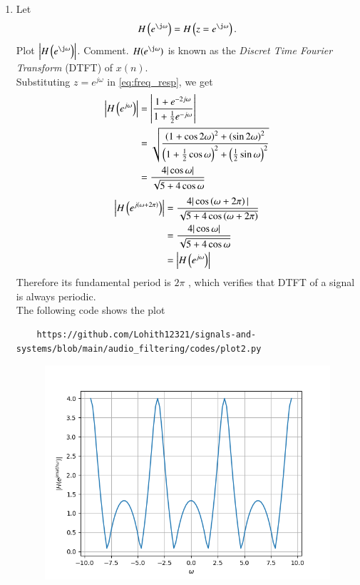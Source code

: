 \documentclass[journal,12pt,twocolumn]{IEEEtran}
\theoremstyle{remark}
\begin{document}
\begin{enumerate}[label=\thesection.\arabic*
,ref=\thesection.\theenumi]
\begin{enumerate}[label=\thesection.\arabic*
,ref=\thesection.\theenumi]
\item Let 
\begin{equation}
H\brak{e^{\j \omega}} = H\brak{z = e^{\j \omega}}.
\end{equation}
Plot $\abs{H\brak{e^{\j \omega}}}$.  Comment.  $H(e^{\j \omega})$ is
known as the {\em Discret Time Fourier Transform} (DTFT) of $x(n)$.\\
\solution 
Substituting $z = e^{j \omega}$ in \eqref{eq:freq_resp}, we get
\begin{align}
	\left|H\left(e^{j\omega}\right)\right| &= \left|\frac{1 + e^{-2j\omega}}{1 + \frac{1}{2}e^{-j\omega}}\right| \\
									  &= \sqrt{\frac{\left(1 + \cos{2\omega}\right)^2 + \left(\sin{2\omega}\right)^2}{\left(1 + \frac{1}{2}\cos{\omega}\right)^2 + \left(\frac{1}{2}\sin{\omega}\right)^2}}\\
									  &= \frac{4|\cos{\omega}|}{\sqrt{5 + 4\cos{\omega}}}
\end{align}
\begin{align}
	\left|H\left(e^{j\left(\omega + 2\pi\right)}\right)\right| &= \frac{4|\cos\left(\omega + 2\pi\right)|}{\sqrt{5 + 4\cos\left(\omega + 2\pi\right)}} \\
											   &= \frac{4|\cos{\omega}|}{\sqrt{5 + 4\cos{\omega}}} \\
											   &= \left|H\left(e^{j\omega}\right)\right|	
\end{align}
Therefore its fundamental period is $2\pi$ , which verifies that DTFT of a signal is always periodic.\\
The following code shows the plot
\begin{lstlisting}
    https://github.com/Lohith12321/signals-and-systems/blob/main/audio_filtering/codes/plot2.py
\end{lstlisting}
\begin{figure}[ht]
    \centering  
\includegraphics[width=\columnwidth]{figs/plot2.png}


\end{figure}
\end{enumerate}
\end{enumerate}
\end{document}
